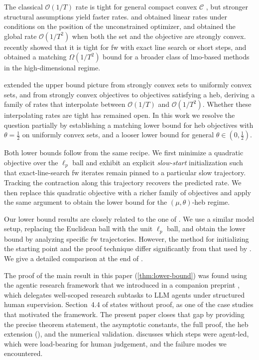 \documentclass{article}
\newcommand{\C}{\mathcal{C}}
\newcommand{\bigo}[1]{\mathcal{O}( #1 )}
\newcommand{\bigomega}[1]{\Omega( #1 )}
\begin{document}
The classical $\bigo{1/T}$ rate \citep{jaggi13revisiting} is tight for general compact convex $\C $ \citep{canon1968tight,lan2013complexity}, but stronger structural assumptions yield faster rates.
\citet{levitin1966constrained} and \citet{wolfe1970convergence} obtained linear rates under conditions on the position of the unconstrained optimizer, and \citet{garber15faster} obtained the global rate $\bigo{1/T^2}$ when both the set and the objective are strongly convex.
\citet{halbey2026lower} recently showed that it is tight for \gls{fw} with exact line search or short steps, and \citet{grimmer2026uniform} obtained a matching $\bigomega{1/T^2}$ bound for a broader class of \gls{lmo}-based methods in the high-dimensional regime.

\citet{kerdreux2021projection} extended the upper bound picture from strongly convex sets to uniformly convex sets, and from strongly convex objectives to objectives satisfying a \gls{heb}, deriving a family of rates that interpolate between $\bigo{1/T}$ and $\bigo{1/T^2}$.
Whether these interpolating rates are tight has remained open.
In this work we resolve the question partially by establishing a matching lower bound for \gls{heb} objectives with $\theta=\tfrac{1}{2}$ on uniformly convex sets, and a looser lower bound for general $\theta \in (0, \tfrac{1}{2})$.

Both lower bounds follow from the same recipe. We first minimize a quadratic objective over the $\ell_p$ ball and exhibit an explicit \emph{slow-start} initialization such that exact-line-search \gls{fw} iterates remain pinned to a particular slow trajectory.
Tracking the contraction along this trajectory recovers the predicted rate.
We then replace this quadratic objective with a richer family of objectives and apply the same argument to obtain the lower bound for the $(\mu,\theta)$-\gls{heb} regime.

Our lower bound results are closely related to the one of \citet{halbey2026lower}.
We use a similar model setup, replacing the Euclidean ball with the unit $\ell_p$ ball, and obtain the lower bound by analyzing specific \gls{fw} trajectories.
However, the method for initializing the starting point and the proof technique differ significantly from that used by \citet{halbey2026lower}.
We give a detailed comparison at the end of .

The proof of the main result in this paper (\cref{thm:lower-bound}) was found using the agentic research framework that we introduced in a companion preprint \citep{zimmer2026agentic}, which delegates well-scoped research subtasks to LLM agents under structured human supervision.
Section~4.4 of \citet{zimmer2026agentic} states  without proof, as one of the case studies that motivated the framework.
The present paper closes that gap by providing the precise theorem statement, the asymptotic constants, the full proof, the \gls{heb} extension (), and the numerical validation.  discusses which steps were agent-led, which were load-bearing for human judgement, and the failure modes we encountered.
\end{document}
